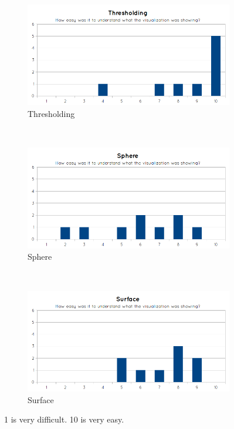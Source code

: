 \begin{figure}[H]
  \centering
  \begin{subfigure}[b]{0.5\textwidth}
    \includegraphics[width=\textwidth]{images/evaluation/graph_thresholding_1.png}
    \caption*{Thresholding}
    \label{fig:eval_visualization_q1_thresholding}
  \end{subfigure}%
  ~ %
  \begin{subfigure}[b]{0.5\textwidth}
    \includegraphics[width=\textwidth]{images/evaluation/graph_sphere_1.png}
    \caption*{Sphere}
    \label{fig:eval_visualization_q1_sphere}
  \end{subfigure}
  ~ %
  \begin{subfigure}[b]{0.5\textwidth}
    \includegraphics[width=\textwidth]{images/evaluation/graph_surface_1.png}
    \caption*{Surface}
    \label{fig:eval_visualization_q1_surface}  
  \end{subfigure}
  \caption{1 is very difficult. 10 is very easy.}\label{fig:eval_visualization_q1}
\end{figure}

